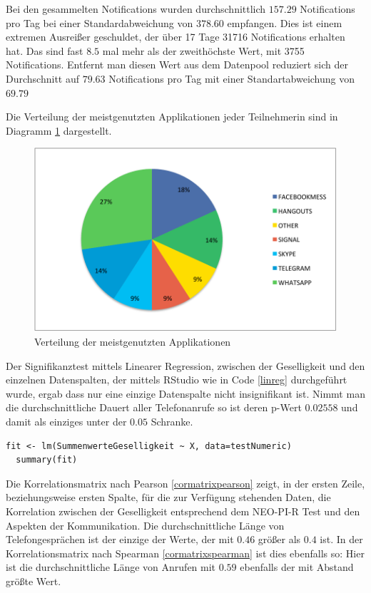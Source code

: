 Bei den gesammelten Notifications wurden durchschnittlich $157.29$ Notifications pro Tag bei einer Standardabweichung von $378.60$ empfangen.
Dies ist einem extremen Ausreißer geschuldet, der über 17 Tage 31716 Notifications erhalten hat. 
Das sind fast $8.5$ mal mehr als der zweithöchste Wert, mit 3755 Notifications.
Entfernt man diesen Wert aus dem Datenpool reduziert sich der Durchschnitt auf $79.63$ Notifications pro Tag mit einer Standartabweichung von $69.79$
\par
Die Verteilung der meistgenutzten Applikationen jeder Teilnehmerin sind in Diagramm \ref{fig:mostusedapp} dargestellt.

\begin{figure}[h]
    \centering
    \includegraphics{images/MostUsedApp.pdf}
    \caption{Verteilung der meistgenutzten Applikationen}
    \label{fig:mostusedapp}
\end{figure}

Der Signifikanztest mittels Linearer Regression, zwischen der Geselligkeit und den einzelnen Datenspalten, der mittels RStudio wie in Code \ref{linreg} durchgeführt wurde, ergab 
dass nur eine einzige Datenspalte nicht insignifikant ist.
Nimmt man die durchschnittliche Dauert aller Telefonanrufe so ist deren p-Wert $0.02558$ und damit als einziges unter der $0.05$ Schranke.

\begin{lstlisting}[frame=single, caption = Lineare Regression, label=linreg] 
  fit <- lm(SummenwerteGeselligkeit ~ X, data=testNumeric)
  summary(fit)
\end{lstlisting}

Die Korrelationsmatrix nach Pearson \ref{cormatrixpearson} zeigt, in der ersten Zeile, beziehungsweise ersten Spalte, für die zur Verfügung stehenden Daten, die Korrelation zwischen der Geselligkeit entsprechend dem NEO-PI-R Test und den Aspekten der Kommunikation.
Die durchschnittliche Länge von Telefongesprächen ist der einzige der Werte, der mit $0.46$ größer als $0.4$ ist.
In der Korrelationsmatrix nach Spearman \ref{cormatrixspearman} ist dies ebenfalls so: Hier ist die durchschnittliche Länge von Anrufen mit $0.59$ ebenfalls der mit Abstand größte Wert.

